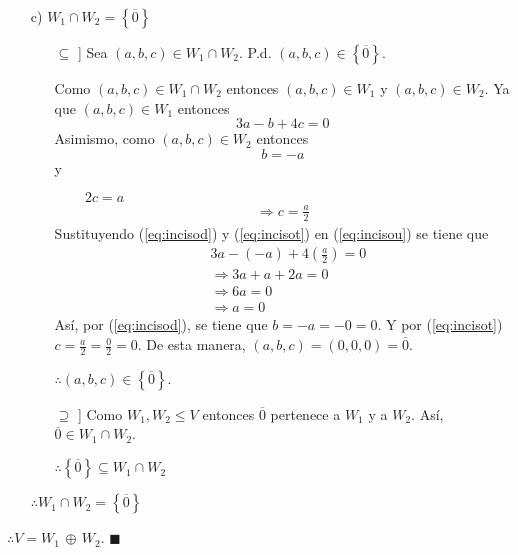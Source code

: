 \documentclass[fleqn]{article}
\begin{document}
\begin{enumerate}
\begin{enumerate}
            \item[c)] $ W_1 \cap W_2 = \left \{\overline{0} \right \} $
            \begin{enumerate}
                \item[$ \subseteq $]] Sea $ (a,b,c) \in W_1 \cap W_2 $. P.d. $ (a,b,c) \in \left \{\overline{0} \right \} $.

                Como $ (a,b,c) \in W_1 \cap W_2 $ entonces $ (a,b,c) \in W_1 $ y $ (a,b,c) \in W_2 $. Ya que $ (a,b,c) \in W_1 $ entonces 
                \begin{equation}
                    3a - b + 4c = 0
                    \label{eq:incisou}
                \end{equation}
                Asimismo, como $ (a,b,c) \in W_2 $ entonces 
                \begin{equation}
                    b = -a 
                    \label{eq:incisod}
                \end{equation} 
                y \par
                $ \quad \quad \, 2c = a $
                \begin{align}
                    \Longrightarrow c = \frac{a}{2}
                    \label{eq:incisot}
                \end{align}
                Sustituyendo (\ref{eq:incisod}) y (\ref{eq:incisot}) en (\ref{eq:incisou}) se tiene que
                \begin{align*}
                    & 3a - (-a) + 4 \left( \frac{a}{2} \right) = 0 \\
                    & \Longrightarrow 3a + a + 2a = 0 \\
                    & \Longrightarrow 6a = 0 \\
                    & \Longrightarrow a = 0
                \end{align*}
                Así, por (\ref{eq:incisod}), se tiene que $ b = -a = -0 = 0 $. Y por (\ref{eq:incisot}) $ c = \displaystyle \frac{a}{2} = \frac{0}{2} = 0 $. De esta manera, $ (a,b,c) = (0,0,0) = \overline{0} $. \par
                $ \therefore (a,b,c) \in \left \{\overline{0} \right \} $.

                \item[$ \supseteq $]] Como $ W_1, W_2 \leq V $ entonces $ \overline{0} $ pertenece a $ W_1 $ y a $ W_2 $. Así, $ \overline{0} \in W_1 \cap W_2 $. \par 

                $ \therefore \left\{\overline{0} \right\} \subseteq W_1 \cap W_2 $
            \end{enumerate}
            $ \therefore W_1 \cap W_2 = \left \{\overline{0} \right \} $
        \end{enumerate}
        $ \therefore V = W_1 \, \oplus \, W_2 $. $ \blacksquare $
    \end{enumerate}
\end{document}
